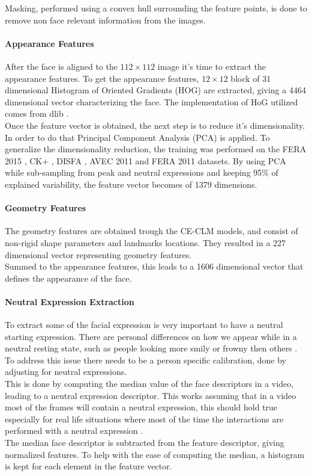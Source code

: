 Masking, performed using a convex hull surrounding the feature points, is done to remove non face relevant information from the images.

\paragraph{Appearance Features}
After the face is aligned to the $112 \times 112$ image it's time to extract the appearance features. To get the appearance features, $12 \times 12$ block of 31 dimensional Histogram of Oriented Gradients (HOG) are extracted, giving a 4464 dimensional vector characterizing the face. The implementation of HoG utilized comes from dlib \cite{dlib}.\\

Once the feature vector is obtained, the next step is to reduce it's dimensionality. In order to do that Principal Component Analysis (PCA) is applied. To generalize the dimensionality reduction, the training was performed on the FERA 2015 \cite{FERA15}, CK+ \cite{CK+}, DISFA \cite{DISFA}, AVEC 2011 \cite{AVEC11} and FERA 2011 \cite{FERA11} datasets. By using PCA while sub-sampling from peak and neutral expressions and keeping 95\% of explained variability, the feature vector becomes of 1379 dimensions.

\paragraph{Geometry Features}
The geometry features are obtained trough the CE-CLM models, and consist of non-rigid shape parameters and landmarks locations. They resulted in a 227 dimensional vector representing geometry features.\\
Summed to the appearance features, this leads to a 1606 dimensional vector that defines the appearance of the face.

\paragraph{Neutral Expression Extraction}
To extract some of the facial expression is very important to have a neutral starting expression. There are personal differences on how we appear while in a neutral resting state, such as people looking more smily or frowny then others \cite{normexpr}. To address this issue there needs to be a person specific calibration, done by adjusting for neutral expressions.\\
This is done by computing the median value of the face descriptors in a video, leading to a neutral expression descriptor. This works assuming that in a video most of the frames will contain a neutral expression, this should hold true especially for real life situations where most of the time the interactions are performed with a neutral expression \cite{NatAffData}.\\
The median face descriptor is subtracted from the feature descriptor, giving normalized features. To help with the ease of computing the median, a histogram is kept for each element in the feature vector.\\

